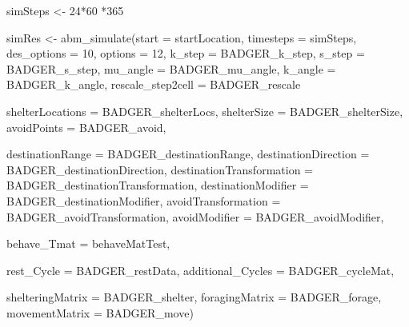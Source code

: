\documentclass[10pt,a4paper]{article}
\newenvironment{Shaded}{}{}
\newcommand{\AttributeTok}[1]{#1}
\newcommand{\DecValTok}[1]{#1}
\newcommand{\FunctionTok}[1]{#1}
\newcommand{\NormalTok}[1]{#1}
\newcommand{\OtherTok}[1]{#1}
\newcommand{\SpecialCharTok}[1]{#1}
\begin{document}
\begin{Shaded}
\begin{Highlighting}[]
\NormalTok{simSteps }\OtherTok{\textless{}{-}} \DecValTok{24}\SpecialCharTok{*}\DecValTok{60} \SpecialCharTok{*}\DecValTok{365}

\NormalTok{simRes }\OtherTok{\textless{}{-}} \FunctionTok{abm\_simulate}\NormalTok{(}\AttributeTok{start =}\NormalTok{ startLocation,}
                       \AttributeTok{timesteps =}\NormalTok{ simSteps,}
                       \AttributeTok{des\_options =} \DecValTok{10}\NormalTok{,}
                       \AttributeTok{options =} \DecValTok{12}\NormalTok{,}
                       \AttributeTok{k\_step =}\NormalTok{ BADGER\_k\_step,}
                       \AttributeTok{s\_step =}\NormalTok{ BADGER\_s\_step,}
                       \AttributeTok{mu\_angle =}\NormalTok{ BADGER\_mu\_angle,}
                       \AttributeTok{k\_angle =}\NormalTok{ BADGER\_k\_angle,}
                       \AttributeTok{rescale\_step2cell =}\NormalTok{ BADGER\_rescale}
                       
                       \AttributeTok{shelterLocations =}\NormalTok{ BADGER\_shelterLocs,}
                       \AttributeTok{shelterSize =}\NormalTok{ BADGER\_shelterSize,}
                       \AttributeTok{avoidPoints =}\NormalTok{ BADGER\_avoid,}
                       
                       \AttributeTok{destinationRange =}\NormalTok{ BADGER\_destinationRange,}
                       \AttributeTok{destinationDirection =}\NormalTok{ BADGER\_destinationDirection,}
                       \AttributeTok{destinationTransformation =}\NormalTok{ BADGER\_destinationTransformation,}
                       \AttributeTok{destinationModifier =}\NormalTok{ BADGER\_destinationModifier,}
                       \AttributeTok{avoidTransformation =}\NormalTok{ BADGER\_avoidTransformation,}
                       \AttributeTok{avoidModifier =}\NormalTok{ BADGER\_avoidModifier,}
                       
                       \AttributeTok{behave\_Tmat =}\NormalTok{ behaveMatTest,}
                       
                       \AttributeTok{rest\_Cycle =}\NormalTok{ BADGER\_restData,}
                       \AttributeTok{additional\_Cycles =}\NormalTok{ BADGER\_cycleMat,}
                       
                       \AttributeTok{shelteringMatrix =}\NormalTok{ BADGER\_shelter,}
                       \AttributeTok{foragingMatrix =}\NormalTok{ BADGER\_forage,}
                       \AttributeTok{movementMatrix =}\NormalTok{ BADGER\_move)}
\end{Highlighting}
\end{Shaded}
\end{document}
